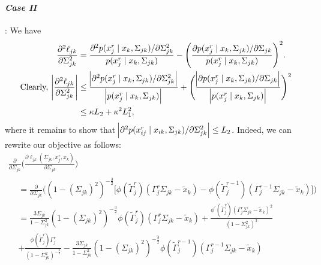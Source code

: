 \begin{condition}
    \paragraph{\textit{Case II}}: We have
    \begin{equation}\label{hessian_case2}
        \begin{split}
            \frac{\partial^2\ell_{jk}}{\partial \Sigma_{jk}^{2}} &= \frac{\partial^2 p(x_j^{r} \mid x_{k}, \Sigma_{jk})/\partial \Sigma_{jk}^{2}}{p(x_j^{r} \mid x_{k}, \Sigma_{jk})} - \Bigg(\frac{\partial p(x_j^{r} \mid x_{k}, \Sigma_{jk}) / \partial \Sigma_{jk}}{p(x_j^{r} \mid x_{k}, \Sigma_{jk})}\Bigg)^2. \\
            \text{Clearly, } \abs{\frac{\partial^2\ell_{jk}}{\partial \Sigma_{jk}^{2}}} &\leq \frac{\abs{\partial^2 p(x_j^{r} \mid x_{k}, \Sigma_{jk})/\partial \Sigma_{jk}^{2}}}{\abs{p(x_j^{r} \mid x_{k}, \Sigma_{jk})}} + \Bigg( \frac{\abs{\partial p(x_j^{r} \mid x_{k}, \Sigma_{jk}) / \partial \Sigma_{jk}}}{\abs{p(x_j^{r} \mid x_{k}, \Sigma_{jk})}} \Bigg)^2 \\
            &\leq \kappa L_2 + \kappa^2 L_1^2,
        \end{split}
    \end{equation}
    where it remains to show that $\abs{\partial^2 p(x_{ij}^{r} \mid x_{ik}, \Sigma_{jk})/\partial \Sigma_{jk}^{2}} \leq L_2$. Indeed, we can rewrite our objective as follows:
    \begin{multline}\label{second_derivative_case2}
        \frac{\partial}{\partial \Sigma_{jk}} \Bigg(\frac{\partial\ell_{jk}(\Sigma_{jk}, x_j^r,x_k)}{\partial \Sigma_{jk}}\Bigg) \\
        \begin{aligned}
             & = \frac{\partial}{\partial \Sigma_{jk}}\Bigg( (1-(\Sigma_{jk})^2)^{-\frac{3}{2}} \Bigg[\phi({\tilde{\Gamma}}_j^{r})({\Gamma}_j^r\Sigma_{jk} - {\tilde{x}}_{k}) - \phi({\tilde{\Gamma}}_j^{r-1})({\Gamma}_j^{r-1}\Sigma_{jk} - {\tilde{x}}_{k})\Bigg] \Bigg)      \\
             & = \frac{3\Sigma_{jk}}{1-\Sigma_{jk}^2} (1-(\Sigma_{jk})^2)^{-\frac{3}{2}} \phi({\tilde{\Gamma}}_j^{r})({\Gamma}_j^r\Sigma_{jk} - {\tilde{x}}_{k}) + \frac{\phi^\prime({\tilde{\Gamma}}_j^{r})({\Gamma}_j^r\Sigma_{jk} - {\tilde{x}}_{k})^2}{(1-\Sigma_{jk}^2)^3} \\
             & + \frac{\phi({\tilde{\Gamma}}_j^{r}){\Gamma}_j^{r}}{(1-\Sigma_{jk}^2)^{-\frac{3}{2}}} - \frac{3\Sigma_{jk}}{1-\Sigma_{jk}^2} (1-(\Sigma_{jk})^2)^{-\frac{3}{2}} \phi({\tilde{\Gamma}}_j^{r-1})({\Gamma}_j^{r-1}\Sigma_{jk} - {\tilde{x}}_{k})                    \\

\end{aligned}
\end{multline}
\end{condition}

